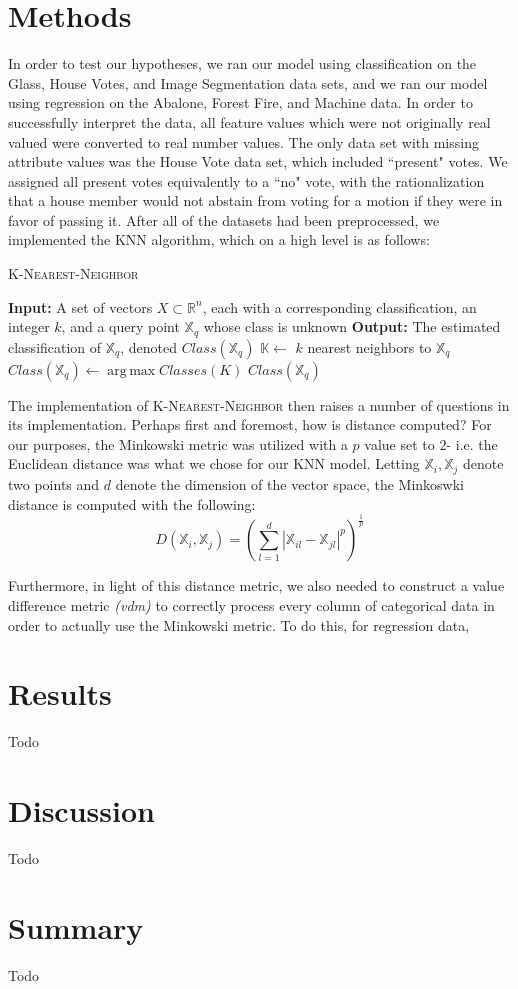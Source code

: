 \documentclass[twoside,11pt]{article}
\DeclareMathOperator*{\argmax}{arg\,max}
\begin{document}
\section{Methods}
In order to test our hypotheses, we ran our model using classification on the Glass, House Votes, and Image Segmentation data sets, and 
we ran our model using regression on the Abalone, Forest Fire, and Machine data. In order to successfully interpret the data, all feature values
which were not originally real valued were converted to real number values. The only data set with missing attribute values was the House Vote
data set, which included ``present" votes. We assigned all present votes equivalently to a ``no" vote, with the rationalization that a house member
would not abstain from voting for a motion if they were in favor of passing it. After all of the datasets had been preprocessed, we implemented the
KNN algorithm, which on a high level is as follows:
\begin{algorithm}
\begin{algorithmic}
\caption{\textsc{K-Nearest-Neighbor}}
\STATE \textbf{Input:} A set of vectors $X \subset \mathbb{R}^n$, each with a corresponding classification, an integer $k$, and a query point $\mathbb{X}_q$ whose class is unknown
\STATE \textbf{Output:} The estimated classification of $\mathbb{X}_q$, denoted $Class(\mathbb{X}_q)$
\STATE $\mathbb{K} \gets$ $k$ nearest neighbors to $\mathbb{X}_q$
\STATE $Class(\mathbb{X}_q) \gets \argmax{Classes(K)}$ 
\STATE \RETURN $Class(\mathbb{X}_q)$
\end{algorithmic}
\end{algorithm}

The implementation of \textsc{K-Nearest-Neighbor} then raises a number of questions in its implementation. Perhaps first and foremost, how is
distance computed? For our purposes, the Minkowski metric was utilized with a $p$ value set to $2$- i.e. the Euclidean distance was
what we chose for our KNN model. Letting $\mathbb{X}_i, \mathbb{X}_j$ denote two points and $d$ denote the dimension of the vector space,
the Minkoswki distance is computed with the following:
\begin{equation}
D(\mathbb{X}_i, \mathbb{X}_j) = (\sum_{l = 1}^{d} |\mathbb{X}_{il} - \mathbb{X}_{jl}|^p)^\frac{1}{p}
\end{equation}

Furthermore, in light of this distance metric, we also needed to construct a value difference metric \textit{(vdm)} to correctly process every column of
categorical data in order to actually use the Minkowski metric. To do this, for regression data, 


\section{Results}
Todo

\section{Discussion}
Todo


\section{Summary}
Todo
\end{document}
